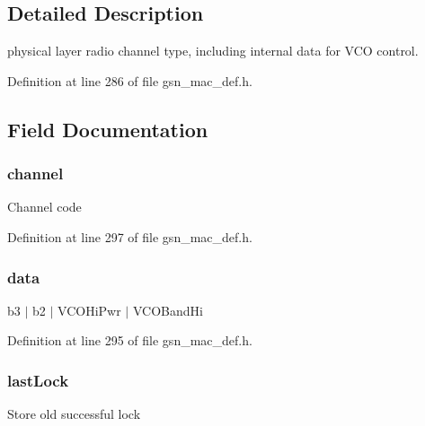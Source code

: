 \subsection{Detailed Description}
physical layer radio channel type, including internal data for VCO control. 

Definition at line 286 of file gsn\_\-mac\_\-def.h.



\subsection{Field Documentation}
\hypertarget{a00118_a52d69a3bd7bdfdfc6f9e40f4962c575d}{
\subsubsection[{channel}]{ {\bf channel}}}
\label{a00118_a52d69a3bd7bdfdfc6f9e40f4962c575d}
Channel code 

Definition at line 297 of file gsn\_\-mac\_\-def.h.

\hypertarget{a00118_adb3d5f23cbb56c00a8e639b8d52f0e2a}{
\subsubsection[{data}]{ {\bf data}}}
\label{a00118_adb3d5f23cbb56c00a8e639b8d52f0e2a}
b3 $|$ b2 $|$ VCOHiPwr $|$ VCOBandHi 

Definition at line 295 of file gsn\_\-mac\_\-def.h.

\hypertarget{a00118_a37be54f8caefdc9dc22a3e2d26f78ce1}{
\subsubsection[{lastLock}]{ {\bf lastLock}}}
\label{a00118_a37be54f8caefdc9dc22a3e2d26f78ce1}
Store old successful lock 

